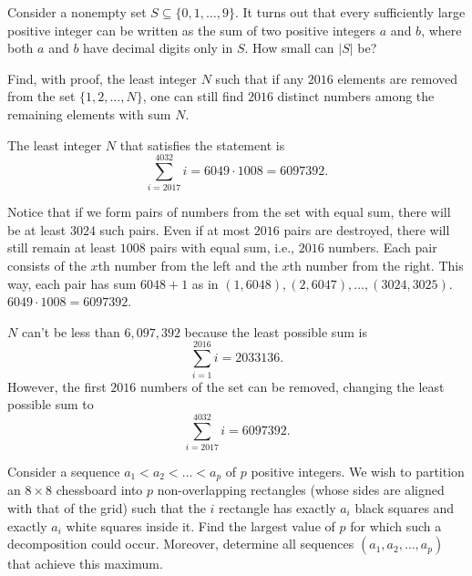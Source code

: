 

\begin{problem}
Consider a nonempty set $S \subseteq \{0, 1, \dots, 9\}$.
It turns out that every sufficiently large positive integer
can be written as the sum of two positive integers $a$ and $b$,
where both $a$ and $b$ have decimal digits only in $S$.
How small can $|S|$ be?
\end{problem} 



\begin{problem}
Find, with proof, the least integer $N$ such that
if any $2016$ elements are removed
from the set $\{1, 2, \dots, N\}$,
one can still find $2016$ distinct numbers
among the remaining elements with sum $N$.
\end{problem} 

The least integer $N$ that satisfies the statement is
\[
	\sum^{4032}_{i=2017} i = 6049 \cdot 1008 = 6097392.
\]

Notice that if we form pairs of numbers from the set with equal sum, there will be
at least $3024$ such pairs. Even if at most $2016$ pairs are destroyed, there will
still remain at least $1008$ pairs with equal sum, i.e., $2016$ numbers. Each pair
consists of the $x$th number from the left and the $x$th number from the right.
This way, each pair has sum $6048+1$ as in $(1,6048), (2,6047), \dots, (3024,3025)$.
$6049 \cdot 1008 = 6097392$.

$N$ can't be less than $6,097,392$ because the least possible sum is
\[
	\sum^{2016}_{i=1} i=2033136.
\]
However, the first $2016$ numbers of the set can be removed, changing the least
possible sum to
\[
	\sum^{4032}_{i=2017} i = 6097392.
\]




\begin{problem}
Consider a sequence $a_1 < a_2 < \dots < a_p$ of $p$ positive integers.
We wish to partition an $8 \times 8$ chessboard into $p$ non-overlapping rectangles
(whose sides are aligned with that of the grid) such that the $i$ rectangle
has exactly $a_i$ black squares and exactly $a_i$ white squares inside it.
Find the largest value of $p$ for which such a decomposition could occur.
Moreover, determine all sequences $(a_1, a_2, \dots, a_p)$ that achieve this maximum.
\end{problem} 

